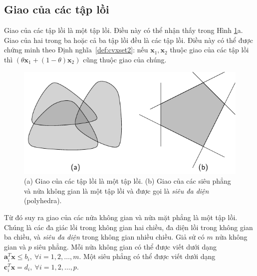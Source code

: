  
 
\subsection{Giao của các tập lồi}
Giao của các tập lồi là một tập lồi. Điều này có thể nhận thấy trong Hình
\ref{fig:16_intersection}a. Giao của hai trong ba hoặc cả ba tập lồi đều là các
tập lồi. Điều này có thể được chứng minh theo Định nghĩa~\ref{def:cvxset2}: nếu
$\mathbf{x}_1, \mathbf{x}_2$ thuộc giao của các tập lồi thì $(\theta\mathbf{x}_1 + (1 - \theta) \mathbf{x}_2)$ cũng thuộc giao của chúng.
 
\begin{figure}[t]
\centering
    \includegraphics[width = .6\textwidth]{Chapters/08_ConvexOptimization/16_convexity/latex/intersection.pdf}
    \caption[]{(a) Giao của các tập lồi là một tập lồi. (b) Giao của các
    siêu phẳng và nửa không gian là một tập lồi và được gọi là \textit{siêu đa diện} (polyhedra).}
    \label{fig:16_intersection}
\end{figure}

Từ đó suy ra giao của các nửa không gian và nửa mặt phẳng
là một tập lồi. Chúng là các đa giác lồi trong không gian hai chiều, đa
diện lồi trong không gian ba chiều, và \textit{siêu đa diện} trong không gian nhiều chiều.
Giả sử có $m$ nửa không gian và $p$ siêu phẳng. Mỗi nửa không gian có thể được viết dưới dạng $\mathbf{a}_i^T\mathbf{x} \leq
b_i, ~\forall i = 1, 2, \dots, m$. Một siêu phẳng có thể được viết
dưới dạng $\mathbf{c}_i^T\mathbf{x} = d_i, ~\forall i = 1, 2, \dots, p$.
 
